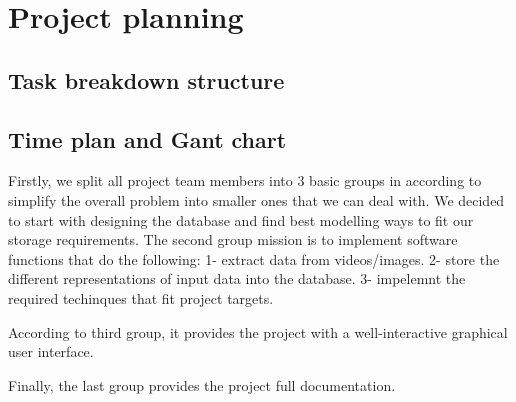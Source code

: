 \chapter{Project planning}
\section{Task breakdown structure}





\section{Time plan and Gant chart}

Firstly, we split all project team members into 3 basic groups in according to simplify the overall problem into 
smaller ones that we can deal with.
\vskip 0.2in
We decided to start with designing the database and find best modelling ways to fit our storage requirements.
\vskip 0.2in
The second group mission is to implement software functions that do the following:
\vskip 0.2in
    1- extract data from videos/images.
    2- store the different representations of input data into the database.
    3- impelemnt the required techinques that fit project targets.

According to third group, it provides the project with a well-interactive graphical user interface.

Finally, the last group provides the project full documentation.







